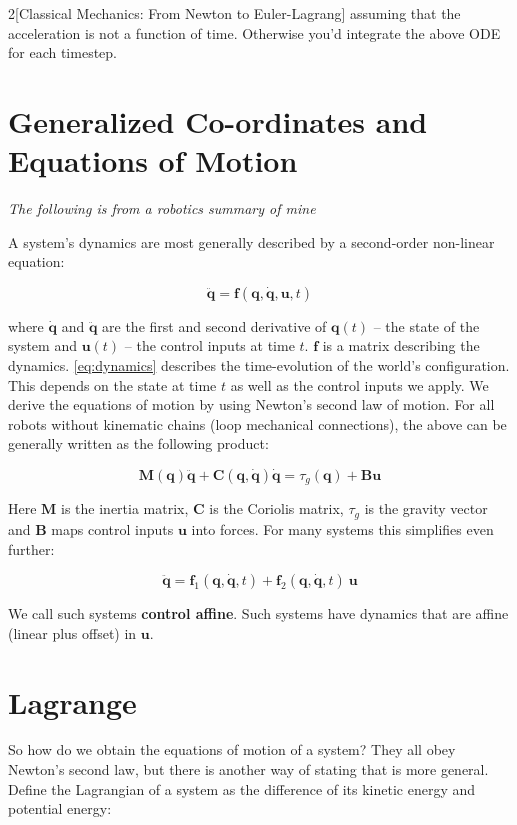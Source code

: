\documentclass{article}
\renewcommand{\vec}{\bm}
\newcommand{\dotvec}[1]{\bm{\dot{#1}}}
\begin{document}
\begin{multicols}{2}[Classical Mechanics: From Newton to Euler-Lagrang]
assuming that the acceleration is not a function of time. Otherwise you'd integrate the above ODE for each timestep.

\section{Generalized Co-ordinates and Equations of Motion}
\textit{The following is from a robotics summary of mine}

    A system's dynamics are most generally described by a second-order non-linear equation:

    \begin{equation} \label{eq:dynamics}
        \ddot{\vec{q}} = \vec{f}(\vec{q}, \dot{\vec{q}}, \vec{u}, t)
    \end{equation}

    where $\dot{\vec{q}}$ and $\ddot{\vec{q}}$ are the first and second derivative of $\vec{q}(t)$ -- the state of the system and $\vec{u}(t)$ -- the control inputs at time $t$. $\vec{f}$ is a matrix describing the dynamics. \autoref{eq:dynamics} describes the time-evolution of the world's configuration. This depends on the state at time $t$ as well as the control inputs we apply. We derive the equations of motion by using Newton's second law of motion. For all robots without kinematic chains (loop mechanical connections), the above can be generally written as the following product:

    \begin{equation} \label{eq:dynamics_standard}
        \vec{M}(\vec{q}) \ddot{\vec{q}} + \vec{C}(\vec{q}, \dot{\vec{q}}) \dot{\vec{q}} =
            \tau_g(\vec{q}) + \vec{B}\vec{u}
    \end{equation}

    Here $\vec{M}$ is the inertia matrix, $\vec{C}$ is the Coriolis matrix, $\tau_g$ is the gravity vector and $\vec{B}$ maps control inputs $\vec{u}$ into forces. For many systems this simplifies even further:

    \begin{equation} \label{eq:affine}
        \ddot{\vec{q}} = \vec{f}_1(\vec{q}, \dotvec{q}, t) + \vec{f}_2(\vec{q}, \dotvec{q}, t)\ \vec{u}
    \end{equation}

    We call such systems \textbf{control affine}. Such systems have dynamics that are affine (linear plus offset) in $\vec{u}$.

\section{Lagrange}
So how do we obtain the equations of motion of a system? They all obey Newton's second law, but there is another way of stating that is more general. Define the Lagrangian of a system as the difference of its kinetic energy and potential energy:


\end{multicols}
\end{document}
